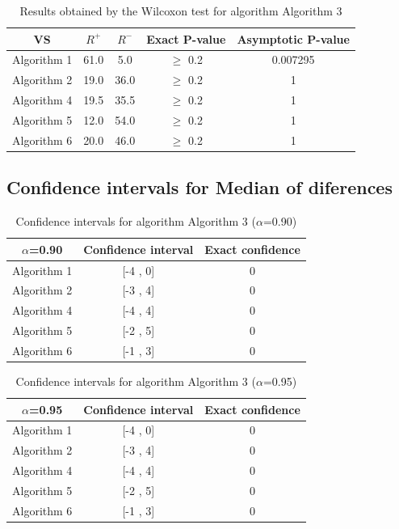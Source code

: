 \documentclass[a4paper,10pt]{article}
\begin{document}
\begin{table}[!htp]
\centering\small
\begin{tabular}{
|c|c|c|c|c|}
\hline
 VS & $R^{+}$ & $R^{-}$ & Exact P-value & Asymptotic P-value \\ \hline 
Algorithm 1 & 61.0 & 5.0 & $\geq$ 0.2 & 0.007295\\ \hline 
Algorithm 2 & 19.0 & 36.0 & $\geq$ 0.2 & 1\\ \hline 
Algorithm 4 & 19.5 & 35.5 & $\geq$ 0.2 & 1\\ \hline 
Algorithm 5 & 12.0 & 54.0 & $\geq$ 0.2 & 1\\ \hline 
Algorithm 6 & 20.0 & 46.0 & $\geq$ 0.2 & 1\\ \hline 

\end{tabular}
\caption{Results obtained by the Wilcoxon test for algorithm Algorithm 3}
\end{table}

\subsection{Confidence intervals for Median of diferences}

\begin{table}[!htp]
\centering\small
\begin{tabular}{
|c|c|c|}
\hline
 $\alpha$=0.90 & Confidence interval & Exact confidence \\ \hline 
Algorithm 1 & [-4 , 0] & 0\\ \hline 
Algorithm 2 & [-3 , 4] & 0\\ \hline 
Algorithm 4 & [-4 , 4] & 0\\ \hline 
Algorithm 5 & [-2 , 5] & 0\\ \hline 
Algorithm 6 & [-1 , 3] & 0\\ \hline 

\end{tabular}
\caption{Confidence intervals for algorithm Algorithm 3 ($\alpha$=0.90)}
\end{table}
\begin{table}[!htp]
\centering\small
\begin{tabular}{
|c|c|c|}
\hline
 $\alpha$=0.95 & Confidence interval & Exact confidence \\ \hline 
Algorithm 1 & [-4 , 0] & 0\\ \hline 
Algorithm 2 & [-3 , 4] & 0\\ \hline 
Algorithm 4 & [-4 , 4] & 0\\ \hline 
Algorithm 5 & [-2 , 5] & 0\\ \hline 
Algorithm 6 & [-1 , 3] & 0\\ \hline 

\end{tabular}
\caption{Confidence intervals for algorithm Algorithm 3 ($\alpha$=0.95)}
\end{table}
\end{document}

